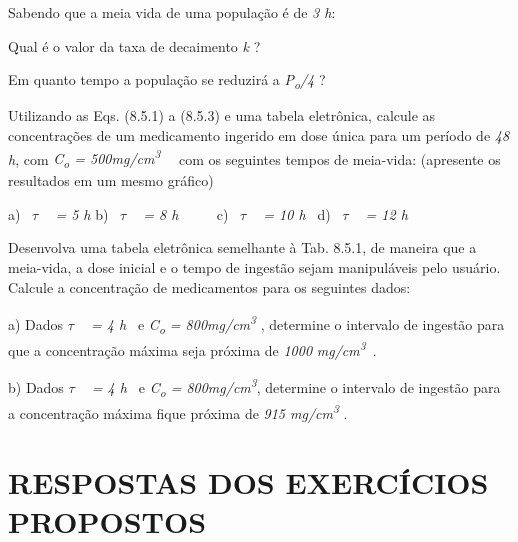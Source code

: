 \begin{exercicios}
	\item Sabendo que a meia vida de uma população é de \textit{3 h}:

	\item Qual é o valor da taxa de decaimento \textit{k} ?

	\item Em quanto tempo a população se reduzirá a \textit{P\textsubscript{o}/4} ?

    \item Utilizando as Eqs. (8.5.1) a (8.5.3) e uma tabela eletrônica, calcule as concentrações de um medicamento ingerido em dose única para um período de \textit{48 h}, com \textit{C\textsubscript{o} = 500mg/cm\textsuperscript{3}}~~ com os seguintes tempos de meia-vida: (apresente os resultados em um mesmo gráfico)

    a)~ \textit{$ \tau$ ~ = 5 h} \quad \quad b)~ \textit{$ \tau$ ~ = 8 h~ \quad ~~~ }c)~ \textit{$ \tau$ ~ = 10 h~ \quad }d)~ \textit{$ \tau$ ~ = 12 h~ }

    \item Desenvolva uma tabela eletrônica semelhante à Tab. 8.5.1, de maneira que a meia-vida, a dose inicial e o tempo de ingestão sejam manipuláveis pelo usuário. Calcule a concentração de medicamentos para os seguintes dados:

    a) Dados \textit{$ \tau$ ~ = 4 h~ }e \textit{C\textsubscript{o} = 800mg/cm\textsuperscript{3 }}, determine o intervalo de ingestão para que a concentração máxima seja próxima de \textit{1000} \textit{mg/cm\textsuperscript{3}}~.~~~  

    b) Dados \textit{$ \tau$ ~ = 4 h~ }e \textit{C\textsubscript{o} = 800mg/cm\textsuperscript{3}}, determine o intervalo de ingestão para a concentração máxima fique próxima de \textit{915 mg/cm\textsuperscript{3}} .

\end{exercicios}

\section{RESPOSTAS DOS EXERCÍCIOS PROPOSTOS}

